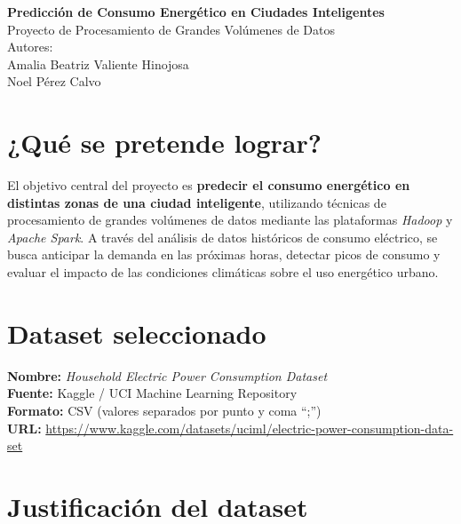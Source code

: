 \documentclass[12pt,a4paper]{article}
\begin{document}
\begin{titlepage}
    \centering
    \vspace*{3cm}
    {\LARGE\textbf{Predicción de Consumo Energético en Ciudades Inteligentes}}\\[1cm]
    {\Large Proyecto de Procesamiento de Grandes Volúmenes de Datos}\\[2cm]
    {\large Autores:}\\[0.3cm]
    {\large Amalia Beatriz Valiente Hinojosa}\\
    {\large Noel Pérez Calvo}\\[1cm]    
    \vfill
\end{titlepage}


\section{¿Qué se pretende lograr?}

El objetivo central del proyecto es \textbf{predecir el consumo energético en distintas zonas de una ciudad inteligente}, utilizando técnicas de procesamiento de grandes volúmenes de datos mediante las plataformas \textit{Hadoop} y \textit{Apache Spark}.  
A través del análisis de datos históricos de consumo eléctrico, se busca anticipar la demanda en las próximas horas, detectar picos de consumo y evaluar el impacto de las condiciones climáticas sobre el uso energético urbano.

\section{Dataset seleccionado}

\textbf{Nombre:} \textit{Household Electric Power Consumption Dataset} \\[0.2cm]
\textbf{Fuente:} Kaggle / UCI Machine Learning Repository \\[0.2cm]
\textbf{Formato:} CSV (valores separados por punto y coma “;”) \\[0.2cm]
\textbf{URL:} \href{https://www.kaggle.com/datasets/uciml/electric-power-consumption-data-set}{https://www.kaggle.com/datasets/uciml/electric-power-consumption-data-set}

\section{Justificación del dataset}
\end{document}
